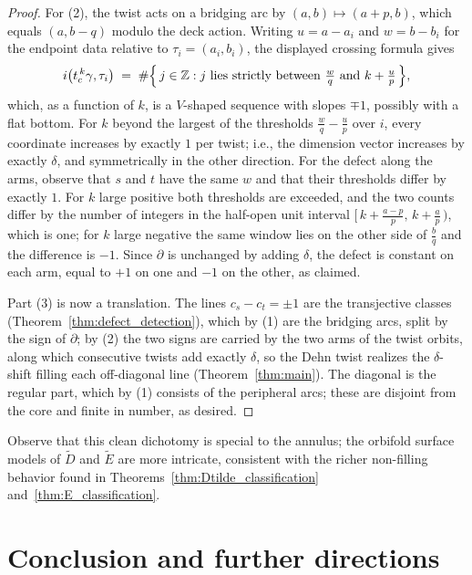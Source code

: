 \documentclass[11pt, a4paper]{amsart}
\theoremstyle{definition}
\newcommand{\ZZ}{\mathbb{Z}}
\begin{document}
\begin{proof}
For (2), the twist acts on a bridging arc by $(a, b) \mapsto (a + p, b)$,
which equals $(a, b - q)$ modulo the deck action. Writing $u = a - a_i$
and $w = b - b_i$ for the endpoint data relative to $\tau_i = (a_i,
b_i)$, the displayed crossing formula gives
\[
  i\bigl(t_c^{\,k}\gamma, \tau_i\bigr)
  \;=\; \#\Bigl\{\, j \in \ZZ :
  j \text{ lies strictly between } \tfrac{w}{q} \text{ and }
  k + \tfrac{u}{p} \,\Bigr\},
\]
which, as a function of $k$, is a $V$-shaped sequence with slopes
$\mp 1$, possibly with a flat bottom. For $k$ beyond the largest of the
thresholds $\frac{w}{q} - \frac{u}{p}$ over $i$, every coordinate
increases by exactly $1$ per twist; i.e., the dimension vector increases
by exactly $\delta$, and symmetrically in the other direction. For the
defect along the arms, observe that $s$ and $t$ have the same $w$ and
that their thresholds differ by exactly $1$. For $k$ large positive both
thresholds are exceeded, and the two counts differ by the number of
integers in the half-open unit interval
$[\,k + \frac{a - p}{p},\, k + \frac{a}{p}\,)$, which is one; for $k$
large negative the same window lies on the other side of $\frac{b}{q}$
and the difference is $-1$. Since $\partial$ is unchanged by adding
$\delta$, the defect is constant on each arm, equal to $+1$ on one and
$-1$ on the other, as claimed.

Part (3) is now a translation. The lines $c_s - c_t = \pm 1$ are the
transjective classes \textup{(}Theorem~\ref{thm:defect_detection}\textup{)},
which by (1) are the bridging arcs, split by the sign of $\partial$; by
(2) the two signs are carried by the two arms of the twist orbits, along
which consecutive twists add exactly $\delta$, so the Dehn twist realizes
the $\delta$-shift filling each off-diagonal line
\textup{(}Theorem~\ref{thm:main}\textup{)}. The diagonal is the regular
part, which by (1) consists of the peripheral arcs; these are disjoint
from the core and finite in number, as desired.
\end{proof}

Observe that this clean dichotomy is special to the annulus; the orbifold
surface models of $\widetilde{D}$ and $\widetilde{E}$ are more intricate,
consistent with the richer non-filling behavior found in
Theorems~\ref{thm:Dtilde_classification}
and~\ref{thm:E_classification}.

\section{Conclusion and further directions}
\label{sec:further}
\end{document}
